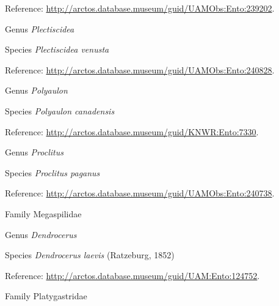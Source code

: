 \documentclass[9pt, article]{memoir}
\begin{document}
\begin{multicols}{2}
\vspace{6pt}Reference: 
\url{http://arctos.database.museum/guid/UAMObs:Ento:239202}.

\vspace{6pt}\noindent\hspace{30pt}Genus \textit{Plectiscidea}


\vspace{6pt}\noindent\hspace{36pt}Species \textit{Plectiscidea venusta}


\vspace{6pt}Reference: 
\url{http://arctos.database.museum/guid/UAMObs:Ento:240828}.

\vspace{6pt}\noindent\hspace{30pt}Genus \textit{Polyaulon}


\vspace{6pt}\noindent\hspace{36pt}Species \textit{Polyaulon canadensis}


\vspace{6pt}Reference: 
\url{http://arctos.database.museum/guid/KNWR:Ento:7330}.

\vspace{6pt}\noindent\hspace{30pt}Genus \textit{Proclitus}


\vspace{6pt}\noindent\hspace{36pt}Species \textit{Proclitus paganus}


\vspace{6pt}Reference: 
\url{http://arctos.database.museum/guid/UAMObs:Ento:240738}.

\vspace{6pt}\noindent\hspace{24pt}Family Megaspilidae


\vspace{6pt}\noindent\hspace{30pt}Genus \textit{Dendrocerus}


\vspace{6pt}\noindent\hspace{36pt}Species \textit{Dendrocerus laevis} (Ratzeburg, 1852)


\vspace{6pt}Reference: 
\url{http://arctos.database.museum/guid/UAM:Ento:124752}.

\vspace{6pt}\noindent\hspace{24pt}Family Platygastridae



\end{multicols}
\end{document}
